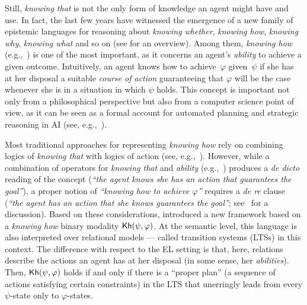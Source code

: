 \begin{textonuevo}
Still, \emph{knowing that} is not the only form of knowledge an agent might have and use. In fact, the last few years have witnessed the emergence of a new family of epistemic languages for reasoning about \emph{knowing whether}, \emph{knowing how}, \emph{knowing why}, \emph{knowing what} and so on (see \cite{Wang16} for an overview). Among them, \emph{knowing how} (e.g.,~\cite{Pavese22}) is one of the most important, as it concerns an agent's \emph{ability} to achieve a given outcome. Intuitively, an agent knows how to achieve~$\varphi$ given~$\psi$ if she has at her disposal a suitable \emph{course of action} guaranteeing that $\varphi$ will be the case whenever she is in a situation in which $\psi$ holds. This concept is important not only from a philosophical perspective but also from a computer science point of view, as it can be seen as a formal account for automated planning and strategic reasoning in AI (see, e.g.,~\cite{KandA15}).

Most traditional approaches for representing \emph{knowing how} rely on combining logics of \emph{knowing that} with logics of action (see, e.g.,~\cite{Mccarthy69,Les00,HerzigT06}). However, while a combination of operators for \emph{knowing that} and \emph{ability} (e.g.,~\cite{wiebeetal:2003}) produces a \emph{de dicto} reading of the concept (\emph{``the agent knows she has an action that guarantees the goal''}), a proper notion of \emph{``knowing how to achieve $\varphi$''} requires a \emph{de re} clause (\emph{``the agent has an action that she knows guarantees the goal''}; see~\cite{JamrogaA07,Herzig15} for a discussion). Based on these considerations, \cite{Wang15lori,Wang2016} introduced a new framework based on a \emph{knowing how} binary modality ${\sf Kh}(\psi,\varphi)$. At the semantic level, this language is also interpreted over relational models --- called transition systems (LTSs) in this context. The difference with respect to the EL setting is that, here, relations describe the actions an agent has at her disposal (in some sense, her \emph{abilities}).
Then, ${\sf Kh}(\psi,\varphi)$ holds if and only if there is a ``proper plan'' (a sequence of actions satisfying certain constraints) in the LTS that unerringly leads from every $\psi$-state only to $\varphi$-states.



\end{textonuevo}
